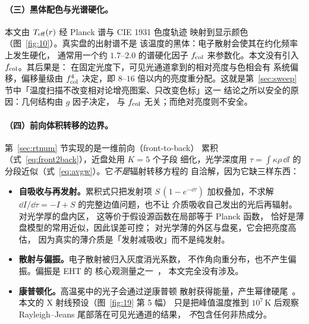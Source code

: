 \paragraph{（三）黑体配色与光谱硬化。}
本文由 $T_{\rm eff}(r)$ 经 Planck 谱与 CIE 1931 色度轨迹
映射到显示颜色（图~\ref{fig:10}）。真实盘的出射谱不是
该温度的黑体：电子散射会使其在约化频率上发生硬化，
通常用一个约 $1.7$--$2.0$ 的谱硬化因子 $f_{\rm col}$
来参数化。本文没有引入 $f_{\rm col}$。其后果是：
在固定光度下，可见光通道拿到的相对亮度与色相会有
系统偏移，偏移量级由 $f_{\rm col}^4$ 决定，即
$8$--$16$ 倍以内的亮度重分配。这就是第~\ref{sec:sweep}
节中「温度扫描不改变相对论增亮图案、只改变色标」这一
结论之所以安全的原因：几何结构由 $g$ 因子决定，
与 $f_{\rm col}$ 无关；而绝对亮度则不安全。

\paragraph{（四）前向体积转移的边界。}
第~\ref{sec:rtnum} 节实现的是一维前向（front-to-back）
累积（式~\eqref{eq:front2back}），近盘处用 $K=5$ 个子段
细化，光学深度用 $\tau=\int\kappa\rho\,\dd l$ 的
分段近似（式~\eqref{eq:avgw}）。它\emph{不是}辐射转移方程的
自洽解，因为它缺三样东西：

\begin{itemize}[leftmargin=1.6em,itemsep=1pt,topsep=3pt]
  \item \textbf{自吸收与再发射。}累积式只把发射项
        $S\,(1-e^{-\dd\tau})$ 加权叠加，不求解
        $\dd I/\dd\tau=-I+S$ 的完整边值问题，也不让
        介质吸收自己发出的光后再辐射。对光学厚的盘内区，
        这等价于假设源函数在局部等于 Planck 函数，
        恰好是薄盘模型的常用近似，因此误差可控；
        对光学薄的外区与盘冕，它会把亮度高估，
        因为真实的薄介质是「发射减吸收」而不是纯发射。
  \item \textbf{散射与偏振。}电子散射被归入灰度消光系数，
        不作角向重分布，也不产生偏振。偏振是 EHT 的
        核心观测量之一~\cite{eht2022,grtrans2016}，
        本文完全没有涉及。
  \item \textbf{康普顿化。}高温冕中的光子会通过逆康普顿
        散射获得能量，产生幂律硬尾~\cite{koral2013}。
        本文的 X 射线预设（图~\ref{fig:19} 第 5 幅）
        只是把峰值温度推到 $10^{7}$\,K 后观察
        Rayleigh--Jeans 尾部落在可见光通道的结果，
        \emph{不}包含任何非热成分。
\end{itemize}

